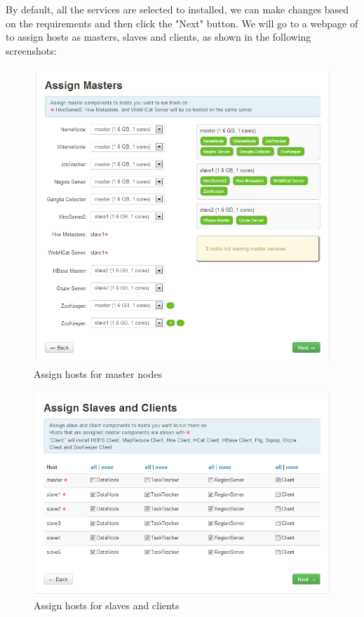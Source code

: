 By default, all the services are selected to installed, we can make changes based on the requirements and then click the "Next" button. We will go to a webpage of to assign hosts as masters, slaves and clients, as shown in the following screenshots:
\begin{figure}[h]
  \centering
  \includegraphics[width=.8\textwidth]{figs/5163os_06_19.png}
  \caption{Assign hosts for master nodes}\label{fig:assign.masters}
\end{figure} 


\begin{figure}[h]
  \centering
  \includegraphics[width=.8\textwidth]{figs/5163os_06_20.png}
  \caption{Assign hosts for slaves and clients}\label{fig:assign.slaves}
\end{figure} 

